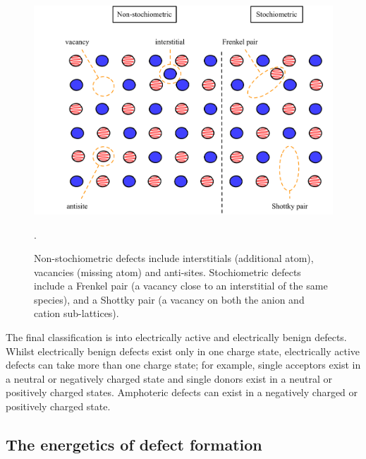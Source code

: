 \begin{figure}[h]
\centering
  \includegraphics[resolution=350]{figures/ch3/classification.png}
  \caption[Classification of crystal point-defects]{Non-stochiometric defects include interstitials (additional atom), vacancies (missing atom) and anti-sites. Stochiometric defects include a Frenkel pair (a vacancy close to an interstitial of the same species), and a Shottky pair (a vacancy on both the anion and cation sub-lattices).}
  \label{classification} . %
\end{figure}

The final classification is into electrically active and electrically benign defects. Whilst electrically benign defects exist only in one charge state, electrically active defects can take more than one charge state; for example, single acceptors exist in a neutral or negatively charged state and single donors exist in a neutral or positively charged states. Amphoteric defects can exist in a negatively charged or positively charged state.

\subsection{The energetics of defect formation} \label{defectformation}

